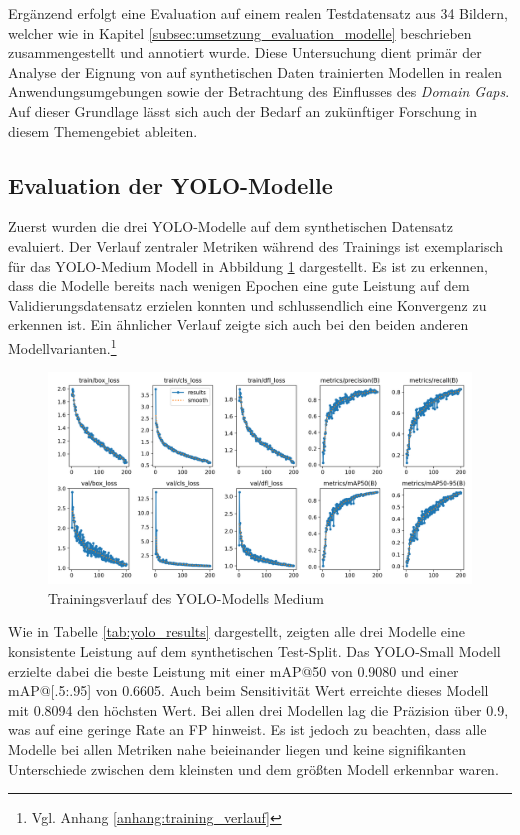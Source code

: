 Ergänzend erfolgt eine Evaluation auf einem realen Testdatensatz aus 34 Bildern, welcher wie in Kapitel \ref{subsec:umsetzung_evaluation_modelle} beschrieben zusammengestellt und annotiert wurde. Diese Untersuchung dient primär der Analyse der Eignung von auf synthetischen Daten trainierten Modellen in realen Anwendungsumgebungen sowie der Betrachtung des Einflusses des \textit{Domain Gaps}. Auf dieser Grundlage lässt sich auch der Bedarf an zukünftiger Forschung in diesem Themengebiet ableiten.


\subsection[Evaluation der YOLO-Modelle]{Evaluation der \ac{YOLO}-Modelle}

Zuerst wurden die drei \ac{YOLO}-Modelle auf dem synthetischen Datensatz evaluiert. Der Verlauf zentraler Metriken während des Trainings ist exemplarisch für das \ac{YOLO}-Medium Modell in Abbildung \ref{fig:training_verlauf} dargestellt. Es ist zu erkennen, dass die Modelle bereits nach wenigen Epochen eine gute Leistung auf dem Validierungsdatensatz erzielen konnten und schlussendlich eine Konvergenz zu erkennen ist. Ein ähnlicher Verlauf zeigte sich auch bei den beiden anderen Modellvarianten.\footnote{Vgl. Anhang \ref{anhang:training_verlauf}}

\begin{figure}[htb]
      \centering                        
      \includegraphics[width=0.9\linewidth]{graphics/yolo_eval/model_m/results.png}
      \caption{Trainingsverlauf des \ac{YOLO}-Modells Medium}
      \label{fig:training_verlauf}
\end{figure}

Wie in Tabelle \ref{tab:yolo_results} dargestellt, zeigten alle drei Modelle eine konsistente Leistung auf dem synthetischen Test-Split. Das \ac{YOLO}-Small Modell erzielte dabei die beste Leistung mit einer \ac{mAP}@50 von 0.9080 und einer \ac{mAP}@[.5:.95] von 0.6605. Auch beim Sensitivität Wert erreichte dieses Modell mit 0.8094 den höchsten Wert. Bei allen drei Modellen lag die Präzision über 0.9, was auf eine geringe Rate an \ac{FP} hinweist.  Es ist jedoch zu beachten, dass alle Modelle bei allen Metriken nahe beieinander liegen und keine signifikanten Unterschiede zwischen dem kleinsten und dem größten Modell erkennbar waren. 

